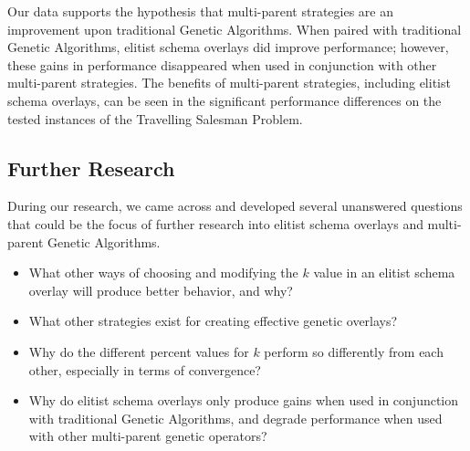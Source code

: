 Our data supports the hypothesis that multi-parent strategies are an improvement upon traditional Genetic Algorithms. When paired with traditional Genetic Algorithms, elitist schema overlays did improve performance; however, these gains in performance disappeared when used in conjunction with other multi-parent strategies. The benefits of multi-parent strategies, including elitist schema overlays, can be seen in the significant performance differences on the tested instances of the Travelling Salesman Problem.

\subsection*{Further Research}
During our research, we came across and developed several unanswered questions that could be the focus of further research into elitist schema overlays and multi-parent Genetic Algorithms.

\begin{itemize}
\item What other ways of choosing and modifying the $k$ value in an elitist schema overlay will produce better behavior, and why?

\item What other strategies exist for creating effective genetic overlays?

\item Why do the different percent values for $k$ perform so differently from each other, especially in terms of convergence?

\item Why do elitist schema overlays only produce gains when used in conjunction with traditional Genetic Algorithms, and degrade performance when used with other multi-parent genetic operators?
\end{itemize}